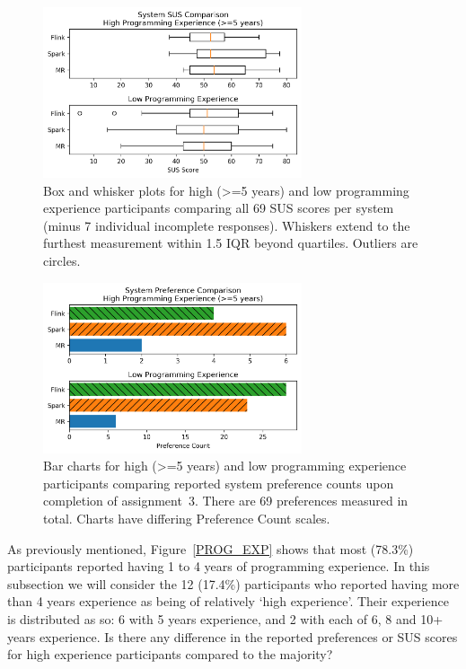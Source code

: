   \begin{figure}[ht]
    \centering
    \includegraphics[width=3in]{./figs/exp-system-sus-comparison.png}
    \caption{Box and whisker plots for high (\textgreater=5 years) and low programming experience participants comparing all 69 SUS scores per system (minus 7 individual incomplete responses). Whiskers extend to the furthest measurement within 1.5 IQR beyond quartiles. Outliers are circles.}
    \label{EXP_SYSTEM_SUS}
  \end{figure}
  
  \begin{figure}[ht]
    \centering
    \includegraphics[width=3in]{./figs/exp-system-preference-comparison.png}
    \caption{Bar charts for high (\textgreater=5 years) and low programming experience participants comparing reported system preference counts upon completion of assignment~3. There are 69 preferences measured in total. Charts have differing Preference Count scales.}
    \label{EXP_SYSTEM_PREF}
  \end{figure}

  As previously mentioned, Figure~\ref{PROG_EXP} shows that most (78.3\%) participants reported having 1 to 4 years of programming experience. In this subsection we will consider the 12 (17.4\%) participants who reported having more than 4 years experience as being of relatively `high experience'. Their experience is distributed as so: 6 with 5 years experience, and 2 with each of 6, 8 and 10+ years experience. Is there any difference in the reported preferences or SUS scores for high experience participants compared to the majority?
  

